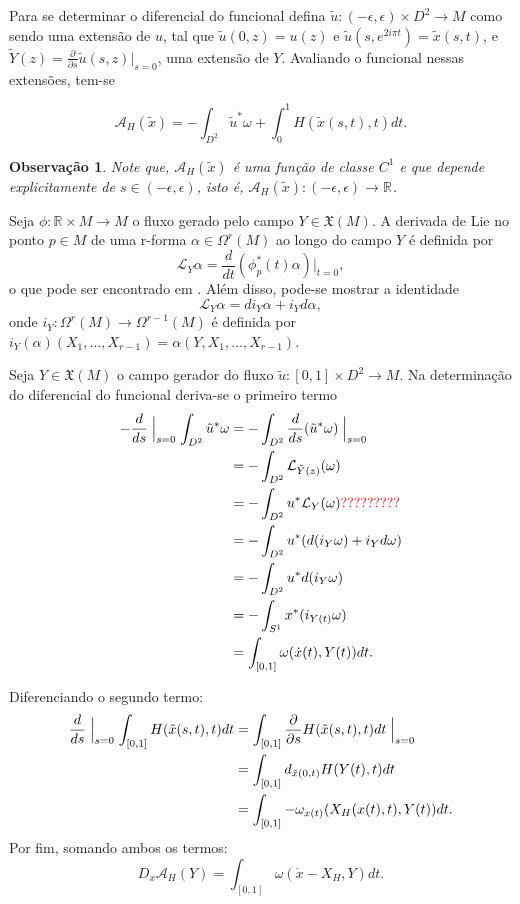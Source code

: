 \documentclass[12pt]{book}
\newtheorem{observacao}[teorema]{Observação}
\newcommand{\campohamiltonianoabrev}{X_{H}}
\newcommand{\campossuaves}[1]{\mathfrak{X}(#1)}
\newcommand{\circulo}{S^{1}}
\newcommand{\derivada}[2]{\frac{d #1}{d #2}}
\newcommand{\derivadaparcial}[2]{\frac{\partial #1}{\partial #2}}
\newcommand{\funcionalH}{\mathcal{A}_{H}}
\newcommand{\funcionalHponto}[1]{\mathcal{A}_{H}(#1)}
\newcommand{\intervalo}{[0,1]}
\newcommand{\liederivada}[1]{\mathcal{L}_{#1}}
\newcommand{\retacartesianovariedade}{\real{} \times M}
\newcommand{\real}[1]{\mathbb{R}^{#1}}
\newcommand{\reta}{\real{}}
\newcommand{\alerta}[1]{{\color{red}#1}}
\begin{document}
	Para se determinar o diferencial do funcional defina $\tilde{u}:(-\epsilon, \epsilon)\times D^{2} \to M$ como sendo uma extensão de $u$, tal que $\tilde{u}(0,z) = u(z)$ e $\tilde{u}(s,e^{2i\pi t}) = \tilde{x}(s,t)$, e $\tilde{Y}(z) = \derivadaparcial{}{s}\tilde{u}(s,z)|_{s=0}$, uma extensão de $Y$. Avaliando o funcional nessas extensões, tem-se
	
	$$
	\funcionalHponto{\tilde{x}} = -\int_{D^{2}}\tilde{u}^{*}\omega + \int_{0}^{1}H(\tilde{x}(s,t),t)dt.
	$$
	
	\begin{observacao}
		Note que, $	\funcionalHponto{\tilde{x}}$ é uma função de classe $C^{1}$ e que depende explicitamente de $s\in (-\epsilon, \epsilon)$, isto é, $	\funcionalHponto{\tilde{x}}:(-\epsilon,\epsilon)\to \reta$. 
	\end{observacao}
	
	Seja $\phi:\retacartesianovariedade\to M$ o fluxo gerado pelo campo $Y\in \campossuaves{M}$. A derivada de Lie no ponto $p\in M $ de uma r-forma $\alpha \in \Omega^{r}(M)$ ao longo do campo $Y$ é definida por 
	$$
	\liederivada{Y}\alpha = \derivada{}{t}(\phi^{*}_{p}(t)\alpha)|_{t=0},
	$$ 
	o que pode ser encontrado em \cite{nakahara}. Além disso, pode-se mostrar a identidade 
	$$
	\liederivada{Y}\alpha= di_{Y}\alpha+i_{Y}d\alpha,
	$$
	onde $i_{Y}:\Omega^{r}(M)\to \Omega^{r-1}(M)$ é definida por $i_{Y}(\alpha)(X_{1}, \dots, X_{r-1}) = \alpha(Y, X_{1}, \dots, X_{r-1})$.
	
	Seja $Y\in \campossuaves{M}$ o campo gerador do fluxo $\tilde{u}:\intervalo\times D^{2}\to M$. Na determinação do diferencial do funcional deriva-se o primeiro termo
	$$
	\begin{aligned}
	-\frac{d}{ds} \Bigm\lvert_{s=0} \int_{D^{2}}\tilde{u}^{*}\omega 
	&=-\int_{D^{2}}\frac{d}{ds} (\tilde{u}^{*}\omega)\Bigm\lvert_{s=0} \\
	&=-\int_{D^{2}} \mathcal{L}_{\tilde{Y}(z)}(\omega)
	\\
	&=-\int_{D^{2}}u^{*} \mathcal{L}_{Y}(\omega)\alerta{?????????}
	\\
	&=-\int_{D^{2}}u^{*} (d(i_{Y}\omega) + i_{Y}d\omega)
	\\
	&=-\int_{D^{2}}u^{*} d(i_{Y}\omega)
	\\
	&=-\int_{\circulo}	x^{*} (i_{Y(t)}\omega)
	\\
	&= \int_{[0,1]} \omega(\dot{x}(t), Y(t))dt.
	\end{aligned}
	$$
	
	Diferenciando o segundo termo:
	$$
	\begin{aligned}
	\frac{d}{ds} \Bigm\lvert_{s=0} \int_{[0,1]} H(\tilde{x}(s,t),t)dt 
	&= \int_{[0,1]} \derivadaparcial{}{s} H(\tilde{x}(s,t),t)dt \Bigm\lvert_{s=0}
	\\
	&= \int_{[0,1]} d_{\tilde{x}(0,t)}H(Y(t),t)dt
	\\
	&= \int_{[0,1]} -\omega_{x(t)}(\campohamiltonianoabrev(x(t), t), Y(t))dt. 
	\end{aligned}
	$$
	Por fim, somando ambos os termos:
	$$
	D_{x}\funcionalH(Y) = \int_{[0,1]} \omega(\dot{x} - \campohamiltonianoabrev, Y)dt.
	$$
	
\end{document}

